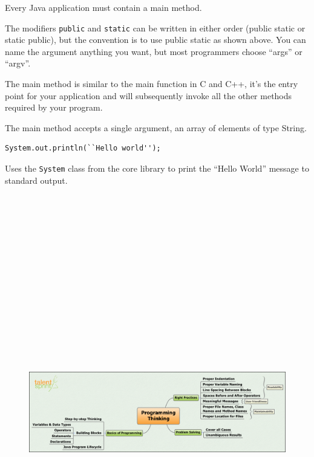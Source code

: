 \documentclass[11pt,a4paper]{article}
\begin{document}
Every Java application must contain a main method.

The modifiers \lstinline!public! and \lstinline!static! can be written in either order (public static or static public), but the convention is to use public static as shown above. You can name the argument anything you want, but most programmers choose ``args'' or ``argv''.

The main method is similar to the main function in C and C++, it's the entry point for your application and will subsequently invoke all the other methods required by your program.

The main method accepts a single argument, an array of elements of type String.

\begin{lstlisting}[numbers=none]
 System.out.println(``Hello world'');
\end{lstlisting}

Uses the \lstinline!System! class from the core library to print the ``Hello World'' message to standard output.
\vfill{\ }
\begin{figure}[H]
 \begin{center}
   \includegraphics[angle=90,height=19cm, width=12cm]{ProgrammingThinking.png}
 \end{center}
 \end{figure}
\end{document}
